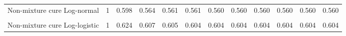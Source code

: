 \documentclass[
]{article}
\begin{document}
\begin{table}[H]
{\begin{tabular}[t]{lrrrrrrrrrrr}
Non-mixture cure Log-normal & 1 & 0.598 & 0.564 & 0.561 & 0.561 & 0.560 & 0.560 & 0.560 & 0.560 & 0.560 & 0.560\\
\cellcolor{gray!10}{Mixture cure Log-logistic} & \cellcolor{gray!10}{1} & \cellcolor{gray!10}{0.624} & \cellcolor{gray!10}{0.606} & \cellcolor{gray!10}{0.604} & \cellcolor{gray!10}{0.604} & \cellcolor{gray!10}{0.604} & \cellcolor{gray!10}{0.604} & \cellcolor{gray!10}{0.604} & \cellcolor{gray!10}{0.603} & \cellcolor{gray!10}{0.603} & \cellcolor{gray!10}{0.603}\\
Non-mixture cure Log-logistic & 1 & 0.624 & 0.607 & 0.605 & 0.604 & 0.604 & 0.604 & 0.604 & 0.604 & 0.604 & 0.604\\
\bottomrule
\end{tabular}}
\end{table}
\end{document}
